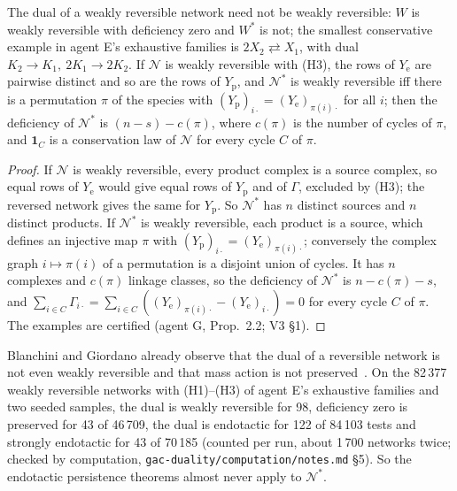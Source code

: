 \documentclass[11pt,a4paper]{report}
\newcommand{\Net}{\mathcal{N}}
\newcommand{\Nd}{\mathcal{N}^{*}}
\newcommand{\Ye}{Y_{\mathrm e}}
\newcommand{\Yp}{Y_{\mathrm p}}
\begin{document}
\begin{proposition}[agents G, E]\label{prop:nonWR}
The dual of a weakly reversible network need not be weakly reversible: \(W\) is weakly reversible with deficiency
zero and \(W^*\) is not; the smallest conservative example in agent E's exhaustive families is \(2X_2\rightleftarrows X_1\), with dual
\(K_2\to K_1,\ 2K_1\to2K_2\). If \(\Net\) is weakly reversible with (H3), the rows of \(\Ye\) are pairwise distinct and so are the rows of
\(\Yp\), and \(\Nd\) is weakly reversible iff there is a permutation \(\pi\) of the species with
\((\Yp)_{i\cdot}=(\Ye)_{\pi(i)\cdot}\) for all \(i\); then the deficiency of \(\Nd\) is \((n-s)-c(\pi)\), where \(c(\pi)\) is
the number of cycles of \(\pi\), and \(\mathbf 1_C\) is a conservation law of \(\Net\) for every cycle \(C\) of \(\pi\).
\end{proposition}
\begin{proof}
If \(\Net\) is weakly reversible, every product complex is a source complex, so equal rows of \(\Ye\) would give equal
rows of \(\Yp\) and of \(\Gamma\), excluded by (H3); the reversed network gives the same for \(\Yp\). So \(\Nd\) has \(n\)
distinct sources and \(n\) distinct products. If \(\Nd\) is weakly reversible, each product is a source, which defines
an injective map \(\pi\) with \((\Yp)_{i\cdot}=(\Ye)_{\pi(i)\cdot}\); conversely the complex graph \(i\mapsto\pi(i)\) of a
permutation is a disjoint union of cycles. It has \(n\) complexes and \(c(\pi)\) linkage classes, so the deficiency of
\(\Nd\) is \(n-c(\pi)-s\), and \(\sum_{i\in C}\Gamma_{i\cdot}=\sum_{i\in C}((\Ye)_{\pi(i)\cdot}-(\Ye)_{i\cdot})=0\) for
every cycle \(C\) of \(\pi\). The examples are certified (agent G, Prop.~2.2; V3 §1).
\end{proof}

Blanchini and Giordano already observe that the dual of a reversible network is not even weakly reversible and that
mass action is not preserved~\autocite[p.~493]{BlanchiniGiordano2022}. On the 82\,377 weakly reversible networks with
(H1)--(H3) of agent E's exhaustive families and two seeded samples, the dual is weakly reversible for 98, deficiency
zero is preserved for 43 of 46\,709, the dual is endotactic for 122 of 84\,103 tests and strongly endotactic for 43 of
70\,185 (counted per run, about 1\,700 networks twice; checked by computation, \texttt{gac-duality/computation/notes.md}
§5). So the endotactic persistence theorems
\autocite{CraciunNazarovPantea2013,GopalkrishnanMillerShiu2014} almost never apply to \(\Nd\).
\end{document}

